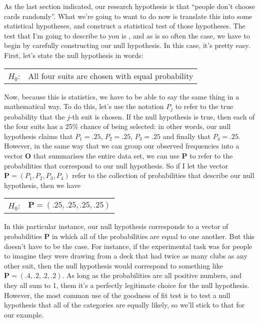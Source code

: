 
As the last section indicated, our research hypothesis is that ``people don't choose cards randomly''. What we're going to want to do now is translate this into some statistical hypotheses, and construct a statistical test of those hypotheses. The test that I'm going to describe to you is , and as is so often the case, we have to begin by carefully constructing our null hypothesis. In this case, it's pretty easy. First, let's state the null hypothesis in words:

\smallskip
\begin{tabular}{ll}
$H_0$: \hspace*{0.5cm} & All four suits are chosen with equal probability
\end{tabular} 
\smallskip

\noindent
Now, because this is statistics, we have to be able to say the same thing in a mathematical way. To do this, let's use the notation $P_j$ to refer to the true probability that the $j$-th suit is chosen. If the null hypothesis is true, then each of the four suits has a 25\% chance of being selected: in other words, our null hypothesis claims that $P_1 = .25$, $P_2 = .25$, $P_3 = .25$ and finally that $P_4 = .25$. However, in the same way that we can group our observed frequencies into a vector $\bm{O}$ that summarises the entire data set, we can use $\bm{P}$ to refer to the probabilities that correspond to our null hypothesis. So if I let the vector $\bm{P} = (P_1, P_2, P_3, P_4)$ refer to the collection of probabilities that describe our null hypothesis, then we have

\smallskip
\begin{tabular}{ll}
$H_0$:\hspace*{0.5cm}  &  $\bm{P} = (.25, .25, .25, .25) $
\end{tabular} 
\smallskip

In this particular instance, our null hypothesis corresponds to a vector of probabilities $\bm{P}$ in which all of the probabilities are equal to one another. But this doesn't have to be the case. For instance, if the experimental task was for people to imagine they were drawing from a deck that had twice as many clubs as any other suit, then the null hypothesis would correspond to something like $\bm{P} = (.4, .2, .2, .2)$. As long as the probabilities are all positive numbers, and they all sum to 1, them it's a perfectly legitimate choice for the null hypothesis. However, the most common use of the goodness of fit test is to test a null hypothesis that all of the categories are equally likely, so we'll stick to that for our example. 

